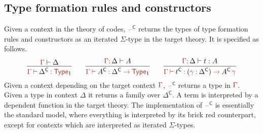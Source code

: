 \documentclass[a4paper,UKenglish]{lipics-v2018}
\newcommand{\ra}{\rightarrow}
\newcommand{\blank}{\mathord{\hspace{1pt}\text{--}\hspace{1pt}}} %
\newcommand{\C}{\mathsf{C}}
\newcommand{\1}{\mathsf{1}} \renewcommand{\Pr}{\mathsf{Pr}}
\renewcommand{\in}{\mathbin{\hat:}}
\renewcommand{\hat}[1]{{\color{BrickRed}{#1}}}
\newcommand{\vdashh}{\mathbin{\hat\vdash}}
\newcommand{\rah}{\mathbin{\hat\ra}}
\newcommand{\Type}{\hat{\mathsf{Type}}}
\newcommand{\semicol}{\hat;\,}
\begin{document}
\subsection{Type formation rules and constructors}
\label{sec:c}

Given a context in the theory of codes, $\blank^\C$ returns the types
of type formation rules and constructors as an iterated $\Sigma$-type
in the target theory. It is specified as follows.
\[
\infer{\hat{\Gamma}\vdashh\Delta^\C\in\Type_1}{\hat{\Gamma}\vdash\Delta}
\hspace{2em}
\infer{\hat{\Gamma}\vdashh A^\C \in \Delta^\C\rah \Type_1}{\hat{\Gamma}\semicol\Delta\vdash A}
\hspace{2em}
\infer{\hat{\Gamma}\vdashh t^\C \in (\hat{\gamma}\in\Delta^\C)\rah  A^\C\,\hat{\gamma}}{\hat{\Gamma}\semicol\Delta\vdash t : A}
\]
Given a context depending on the target context $\hat{\Gamma}$,
$\blank^\C$ returns a type in $\hat{\Gamma}$. Given a type in context
$\Delta$ it returns a family over $\Delta^\C$. A term is interpreted
by a dependent function in the target theory. The implementation of
$\blank^\C$ is essentially the standard model, where everything is
interpreted by its {\color{BrickRed}brick red} counterpart, except for
contexts which are interpreted as iterated $\Sigma$-types.\begingroup
\allowdisplaybreaks
\end{document}
